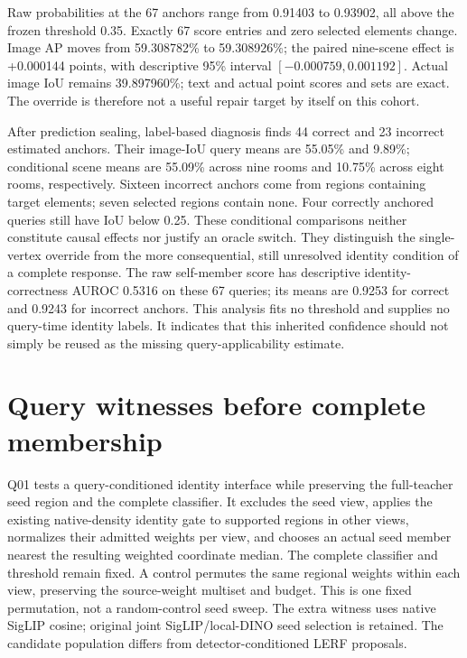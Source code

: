 \documentclass[10pt]{article}
\begin{document}
Raw probabilities at the 67 anchors range from 0.91403 to 0.93902, all above
the frozen threshold 0.35. Exactly 67 score entries and zero selected elements
change. Image AP moves from 59.308782\% to 59.308926\%; the paired nine-scene
effect is +0.000144 points, with descriptive 95\% interval
$[-0.000759,0.001192]$. Actual image IoU remains 39.897960\%; text and actual
point scores and sets are exact. The override is therefore not a useful repair
target by itself on this cohort.

After prediction sealing, label-based diagnosis finds 44 correct and 23 incorrect
estimated anchors. Their image-IoU query means are 55.05\% and 9.89\%; conditional
scene means are 55.09\% across nine rooms and 10.75\% across eight rooms, respectively.
Sixteen incorrect anchors come from regions containing target elements; seven
selected regions contain none. Four correctly anchored queries still have IoU
below 0.25. These conditional comparisons neither constitute causal effects nor
justify an oracle switch. They distinguish the single-vertex override from the
more consequential, still unresolved identity condition of a complete response.
The raw self-member score has descriptive identity-correctness AUROC 0.5316 on
these 67 queries; its means are 0.9253 for correct and 0.9243 for incorrect anchors.
This analysis fits no threshold and supplies no query-time identity labels.
It indicates that this inherited confidence should not simply be reused as the
missing query-applicability estimate.

\section{Query witnesses before complete membership}
Q01 tests a query-conditioned identity interface while preserving the full-teacher
seed region and the complete classifier. It excludes the seed view, applies the
existing native-density identity gate to supported regions in other views,
normalizes their admitted weights per view, and chooses an actual seed member
nearest the resulting weighted coordinate median. The complete classifier and
threshold remain fixed. A control permutes the same regional weights within
each view, preserving the source-weight multiset and budget. This is one fixed
permutation, not a random-control seed sweep. The extra witness uses native
SigLIP cosine; original joint SigLIP/local-DINO seed selection is retained.
The candidate population differs from detector-conditioned LERF proposals.
\end{document}
